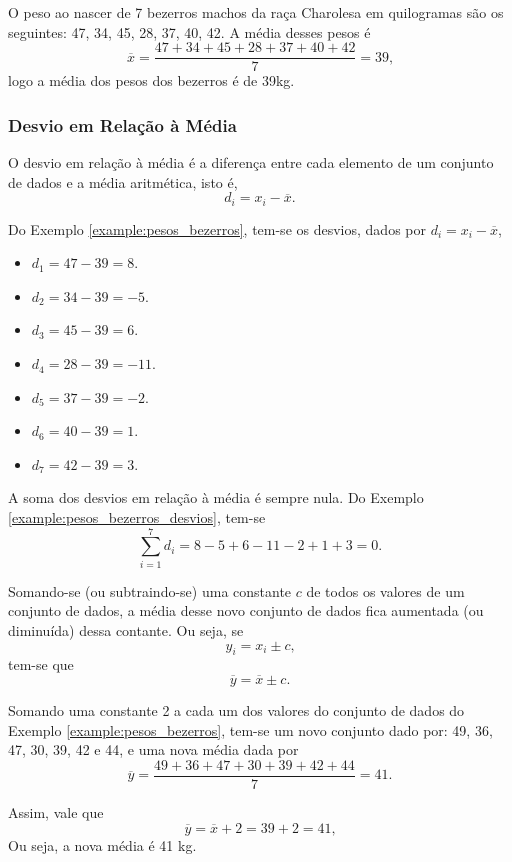\documentclass[11pt,fleqn]{book}
\numberwithin{mpicture}{chapter}
\numberwithin{mtable}{chapter}
\numberwithin{mframe}{chapter}
\begin{document}
\begin{example}
	\label{example:pesos_bezerros}
	O peso ao nascer de 7 bezerros machos da raça Charolesa em quilogramas são os seguintes: 47, 34, 45, 28, 37, 40, 42. A média desses pesos é
	\[
		\overline{x}=\frac{47+34+45+28+37+40+42}{7}=39\text{,}
	\]
	logo a média dos pesos dos bezerros é de 39kg.
\end{example}

\subsubsection{Desvio em Relação à Média}

O desvio em relação à média é a diferença entre cada elemento de um conjunto de dados e a média aritmética, isto é,
\[
	d_i=x_i-\overline{x}\text{.}
\]

\begin{example}
	\label{example:pesos_bezerros_desvios}
	Do Exemplo \ref{example:pesos_bezerros}, tem-se os desvios, dados por $d_i=x_i-\overline{x}$,
	\begin{itemize}
		\item $d_1=47-39=8$.
		\item $d_2=34-39=-5$.
		\item $d_3=45-39=6$.
		\item $d_4=28-39=-11$.
		\item $d_5=37-39=-2$.
		\item $d_6=40-39=1$.
		\item $d_7=42-39=3$.
	\end{itemize}
\end{example}

A soma dos desvios em relação à média é sempre nula. Do Exemplo \ref{example:pesos_bezerros_desvios}, tem-se
\[
	\sum_{i=1}^{7}d_i = 8-5+6-11-2+1+3=0\text{.}
\]

\begin{theorem}
	Somando-se (ou subtraindo-se) uma constante $c$ de todos os valores de um conjunto de dados, a média desse novo conjunto de dados fica aumentada (ou diminuída) dessa contante. Ou seja, se
	\[
		y_i=x_i\pm c\text{,}
	\]
	tem-se que
	\[
		\overline{y}=\overline{x}\pm c\text{.}
	\]
\end{theorem}

\begin{example}
	Somando uma constante 2 a cada um dos valores do conjunto de dados do Exemplo \ref{example:pesos_bezerros}, tem-se um novo conjunto dado por: 49, 36, 47, 30, 39, 42 e 44, e uma nova média dada por
	\[
		\overline{y}=\frac{49+36+47+30+39+42+44}{7}=41\text{.}
	\]
	
	Assim, vale que
	\[
		\overline{y}=\overline{x}+2=39+2=41\text{,}
	\]
	Ou seja, a nova média é 41 kg.
\end{example}
\end{document}
